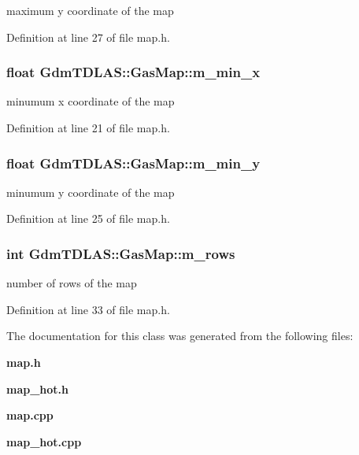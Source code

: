 maximum y coordinate of the map 



Definition at line 27 of file map.h.

\subsubsection[{m\_\-min\_\-x}]{\setlength{\rightskip}{0pt plus 5cm}float {\bf GdmTDLAS::GasMap::m\_\-min\_\-x}\hspace{0.3cm}{\ttfamily  [private]}}\label{classGdmTDLAS_1_1GasMap_ac5d56870a48f2e5be61896f19622f28b}


minumum x coordinate of the map 



Definition at line 21 of file map.h.

\subsubsection[{m\_\-min\_\-y}]{\setlength{\rightskip}{0pt plus 5cm}float {\bf GdmTDLAS::GasMap::m\_\-min\_\-y}\hspace{0.3cm}{\ttfamily  [private]}}\label{classGdmTDLAS_1_1GasMap_acf348ff87a503f510ba4b6954b72d85b}


minumum y coordinate of the map 



Definition at line 25 of file map.h.

\subsubsection[{m\_\-rows}]{\setlength{\rightskip}{0pt plus 5cm}int {\bf GdmTDLAS::GasMap::m\_\-rows}\hspace{0.3cm}{\ttfamily  [private]}}\label{classGdmTDLAS_1_1GasMap_a6359b35046e31e39c70002395bb86c05}


number of rows of the map 



Definition at line 33 of file map.h.



The documentation for this class was generated from the following files:\begin{DoxyCompactItemize}
\item 
{\bf map.h}\item 
{\bf map\_\-hot.h}\item 
{\bf map.cpp}\item 
{\bf map\_\-hot.cpp}\end{DoxyCompactItemize}
